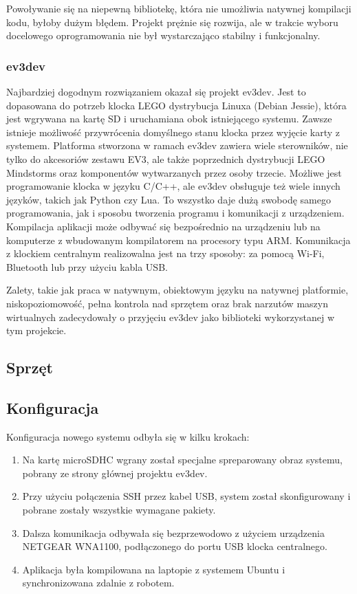 Powoływanie się na niepewną bibliotekę, która nie umożliwia natywnej kompilacji kodu, byłoby dużym błędem. Projekt prężnie się rozwija, ale w trakcie wyboru docelowego oprogramowania nie był wystarczająco stabilny i funkcjonalny.

\subsubsection{ev3dev}

Najbardziej dogodnym rozwiązaniem okazał się projekt ev3dev. Jest to dopasowana do potrzeb klocka LEGO dystrybucja Linuxa (Debian Jessie), która jest wgrywana na kartę SD i uruchamiana obok istniejącego systemu. Zawsze istnieje możliwość przywrócenia domyślnego stanu klocka przez wyjęcie karty z systemem. Platforma stworzona w ramach ev3dev zawiera wiele sterowników, nie tylko do akcesoriów zestawu EV3, ale także poprzednich dystrybucji LEGO Mindstorms oraz komponentów wytwarzanych przez osoby trzecie. Możliwe jest programowanie klocka w języku C/C++, ale ev3dev obsługuje też wiele innych języków, takich jak Python czy Lua. To wszystko daje dużą swobodę samego programowania, jak i sposobu tworzenia programu i komunikacji z urządzeniem. Kompilacja aplikacji może odbywać się bezpośrednio na urządzeniu lub na komputerze z wbudowanym kompilatorem na procesory typu ARM. Komunikacja z klockiem centralnym realizowalna jest na trzy sposoby: za pomocą Wi-Fi, Bluetooth lub przy użyciu kabla USB.

Zalety, takie jak praca w natywnym, obiektowym języku na natywnej platformie, niskopoziomowość, pełna kontrola nad sprzętem oraz brak narzutów maszyn wirtualnych zadecydowały o przyjęciu ev3dev jako biblioteki wykorzystanej w tym projekcie.

\subsection{Sprzęt}


\subsection{Konfiguracja}
Konfiguracja nowego systemu odbyła się w kilku krokach:

\begin{enumerate}
    \item Na kartę microSDHC wgrany został specjalne spreparowany obraz systemu, pobrany ze strony głównej projektu ev3dev.
    \item Przy użyciu połączenia SSH przez kabel USB, system został skonfigurowany i pobrane zostały wszystkie wymagane pakiety.
    \item Dalsza komunikacja odbywała się bezprzewodowo z użyciem urządzenia NETGEAR WNA1100, podłączonego do portu USB klocka centralnego.
    \item Aplikacja była kompilowana na laptopie z systemem Ubuntu i synchronizowana zdalnie z robotem.
\end{enumerate}

